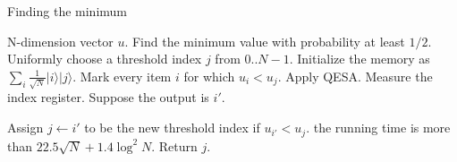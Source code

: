\documentclass{article}
\begin{document}
\pagestyle{empty} 

\begin{algorithm}[ht]
	\caption{Finding the minimum}
	\label{FindingMin}
	\begin{algorithmic}[1]

		\Require N-dimension vector $u$.
		\Ensure Find the minimum value with probability at least $1/2$.
		\vspace{10pt}
		\State Uniformly choose a threshold index $j$ from $0..N-1$.
		\Repeat
		\State Initialize the memory as $\sum_{i} \frac{1}{\sqrt{N}}|i\rangle|j\rangle$.
		Mark every item $i$ for which $u_i < u_j$.
		\State Apply QESA.
		\State Measure the index register. Suppose the output is $i'$.

		Assign $j \leftarrow i'$ to be the new threshold index if $u_{i'} < u_j$.
		\Until the running time is more than $22.5\sqrt{N} + 1.4\log^2{N}$.
		\State Return $j$.
	\end{algorithmic}
\end{algorithm}
\end{document}

